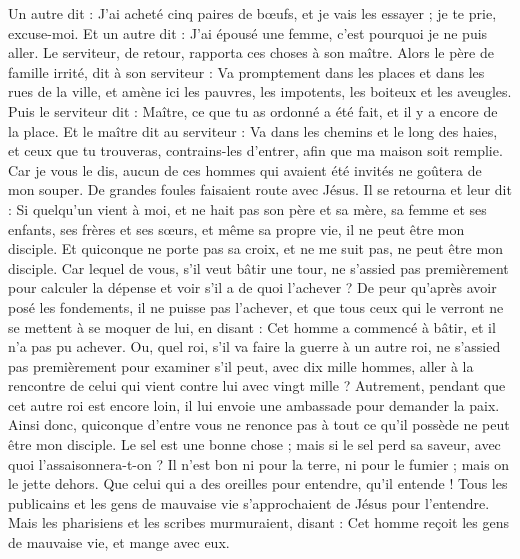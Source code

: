 \begin{multicols}{2}
Un autre dit : J'ai acheté cinq paires de bœufs, et je vais les essayer ; je te prie, excuse-moi.
Et un autre dit : J'ai épousé une femme, c'est pourquoi je ne puis aller.
Le serviteur, de retour, rapporta ces choses à son maître. Alors le père de famille irrité, dit à son serviteur : Va promptement dans les places et dans les rues de la ville, et amène ici les pauvres, les impotents, les boiteux et les aveugles.
Puis le serviteur dit : Maître, ce que tu as ordonné a été fait, et il y a encore de la place.
Et le maître dit au serviteur : Va dans les chemins et le long des haies, et ceux que tu trouveras, contrains-les d'entrer, afin que ma maison soit remplie.
Car je vous le dis, aucun de ces hommes qui avaient été invités ne goûtera de mon souper.
De grandes foules faisaient route avec Jésus. Il se retourna et leur dit :
Si quelqu'un vient à moi, et ne hait pas son père et sa mère, sa femme et ses enfants, ses frères et ses sœurs, et même sa propre vie, il ne peut être mon disciple.
Et quiconque ne porte pas sa croix, et ne me suit pas, ne peut être mon disciple.
Car lequel de vous, s'il veut bâtir une tour, ne s'assied pas premièrement pour calculer la dépense et voir s'il a de quoi l'achever ?
De peur qu'après avoir posé les fondements, il ne puisse pas l'achever, et que tous ceux qui le verront ne se mettent à se moquer de lui,
en disant : Cet homme a commencé à bâtir, et il n'a pas pu achever.
Ou, quel roi, s'il va faire la guerre à un autre roi, ne s'assied pas premièrement pour examiner s'il peut, avec dix mille hommes, aller à la rencontre de celui qui vient contre lui avec vingt mille ?
Autrement, pendant que cet autre roi est encore loin, il lui envoie une ambassade pour demander la paix.
Ainsi donc, quiconque d'entre vous ne renonce pas à tout ce qu'il possède ne peut être mon disciple.
Le sel est une bonne chose ; mais si le sel perd sa saveur, avec quoi l'assaisonnera-t-on ?
Il n'est bon ni pour la terre, ni pour le fumier ; mais on le jette dehors. Que celui qui a des oreilles pour entendre, qu'il entende !
\VerseOne{}Tous les publicains et les gens de mauvaise vie s'approchaient de Jésus pour l'entendre.
Mais les pharisiens et les scribes murmuraient, disant : Cet homme reçoit les gens de mauvaise vie, et mange avec eux.

\end{multicols}
